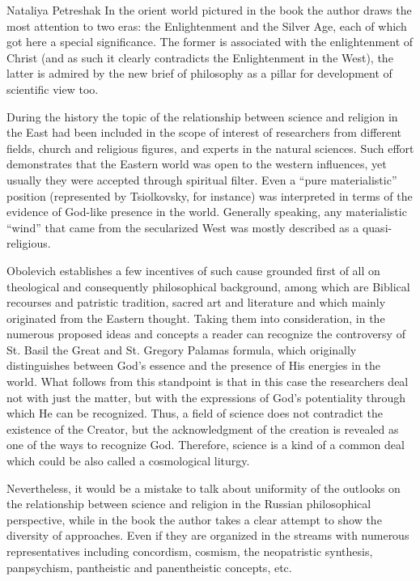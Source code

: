 \begin{recplenv}{Nataliya Petreshak}
In the orient world pictured in the book the author draws the most attention to two eras: the Enlightenment and the Silver Age,
each of
which got here a special significance. The former is associated with the enlightenment of Christ (and as such it
clearly
contradicts the Enlightenment in the West), the latter is admired by the new brief of philosophy as a pillar for
development of scientific view too.


During the history the topic of the relationship between science and religion in the East had been included in the
scope of interest of researchers from different fields, church and religious figures, and experts in the natural sciences. Such
effort demonstrates that the Eastern world was open to the western influences, yet usually they were accepted through
spiritual filter. Even a ``pure materialistic'' position (represented by Tsiolkovsky, for instance)
was interpreted in terms of the evidence of
God-like presence in the world. Generally speaking, any materialistic ``wind'' that came from the secularized West was mostly
described as a quasi-religious.


Obolevich establishes a few incentives of such cause grounded first of all on theological and consequently
philosophical background, among which are Biblical recourses and patristic tradition, sacred art and literature and
which mainly originated from the Eastern thought.
Taking them into consideration, in the numerous proposed ideas and concepts a reader can recognize
the controversy of St. Basil the Great and St. Gregory Palamas
formula, which originally distinguishes between God’s essence and the presence of His energies in the world.
What follows from this standpoint is that in this case the researchers deal not with just the matter, but with the
expressions of God’s potentiality through which He can be recognized. Thus, a field of science does not
contradict the existence of the Creator, but the acknowledgment of the creation is revealed as one of the ways to
recognize God. Therefore, science is a kind of a common deal which could be also called a cosmological liturgy.


Nevertheless, it would be a mistake to talk about uniformity of the outlooks on the relationship between science and religion in
the Russian philosophical perspective, while in the book the author takes a clear attempt to show the diversity of
approaches. Even if they are organized in the streams with numerous representatives including concordism, cosmism, the
neopatristic synthesis, panpsychism, pantheistic and panentheistic concepts, etc.



\end{recplenv}
